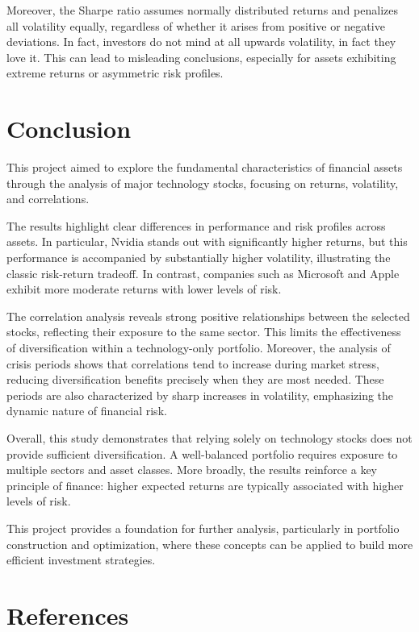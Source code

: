 \documentclass{article}
\begin{document}
\vspace{0.3cm}
Moreover, the Sharpe ratio assumes normally distributed returns and penalizes all volatility equally, regardless of whether it arises from positive or negative deviations. In fact, investors do not mind at all upwards volatility, in fact they love it. This can lead to misleading conclusions, especially for assets exhibiting extreme returns or asymmetric risk profiles.
\pagebreak
\section{Conclusion}

This project aimed to explore the fundamental characteristics of financial assets through the analysis of major technology stocks, focusing on returns, volatility, and correlations.

\vspace{0.3cm}
The results highlight clear differences in performance and risk profiles across assets. In particular, Nvidia stands out with significantly higher returns, but this performance is accompanied by substantially higher volatility, illustrating the classic risk-return tradeoff. In contrast, companies such as Microsoft and Apple exhibit more moderate returns with lower levels of risk.

\vspace{0.3cm}
The correlation analysis reveals strong positive relationships between the selected stocks, reflecting their exposure to the same sector. This limits the effectiveness of diversification within a technology-only portfolio. Moreover, the analysis of crisis periods shows that correlations tend to increase during market stress, reducing diversification benefits precisely when they are most needed. These periods are also characterized by sharp increases in volatility, emphasizing the dynamic nature of financial risk.

\vspace{0.3cm}
Overall, this study demonstrates that relying solely on technology stocks does not provide sufficient diversification. A well-balanced portfolio requires exposure to multiple sectors and asset classes. More broadly, the results reinforce a key principle of finance: higher expected returns are typically associated with higher levels of risk.

\vspace{0.3cm}
This project provides a foundation for further analysis, particularly in portfolio construction and optimization, where these concepts can be applied to build more efficient investment strategies.

\pagebreak
\section{References}
{%
\printbibliography[title = {Bibliography}]
}
\end{document}
